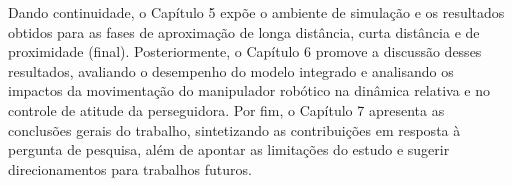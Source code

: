 Dando continuidade, o Capítulo 5 expõe o ambiente de simulação e os resultados obtidos para as fases de aproximação de longa distância, curta distância e de proximidade (final).
Posteriormente, o Capítulo 6 promove a discussão desses resultados, avaliando o desempenho do modelo integrado e analisando os impactos da movimentação do manipulador robótico na dinâmica relativa e no controle de atitude da perseguidora.
Por fim, o Capítulo 7 apresenta as conclusões gerais do trabalho, sintetizando as contribuições em resposta à pergunta de pesquisa, além de apontar as limitações do estudo e sugerir direcionamentos para trabalhos futuros.